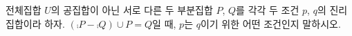 전체집합 $U$의 공집합이 아닌 서로 다른 두 부분집합 $P$, $Q$를 각각 두 조건 $p$, $q$의 진리집합이라 하자. $(\comp{P}-\comp{Q})\cup P=Q$일 때, $p$는 $q$이기 위한 어떤 조건인지 말하시오.

